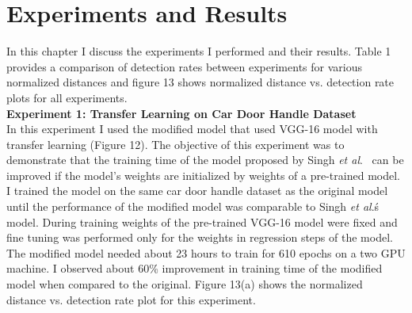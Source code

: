 \documentclass [11pt,letterpaper ,openany ]{report}
\begin{document}
    \chapter{Experiments and Results}
    \doublespacing

    In this chapter I discuss the experiments I performed and their results. Table 1 provides a comparison of detection rates between experiments for various normalized distances and figure 13 shows normalized distance vs. detection rate plots for all experiments.\\

    \noindent
    \textbf{Experiment 1: Transfer Learning on Car Door Handle Dataset}\\    
    In this experiment I used the modified model that used VGG-16 model with transfer learning (Figure 12). The objective of this experiment was to demonstrate that the training time of the model proposed by Singh \textit{et al}.\ \cite{Singh_2016_CVPR} can be improved if the model's weights are initialized by weights of a pre-trained model. I trained the model on the same car door handle dataset as the original model until the performance of the modified model was comparable to Singh \textit{et al}.\'s model. During training weights of the pre-trained VGG-16 model were fixed and fine tuning was performed only for the weights in regression steps of the model. The modified model needed about 23 hours to train for 610 epochs on a two GPU machine. I observed about 60\% improvement in training time of the modified model when compared to the original. Figure 13(a) shows the normalized distance vs. detection rate plot for this experiment.
\end{document}
